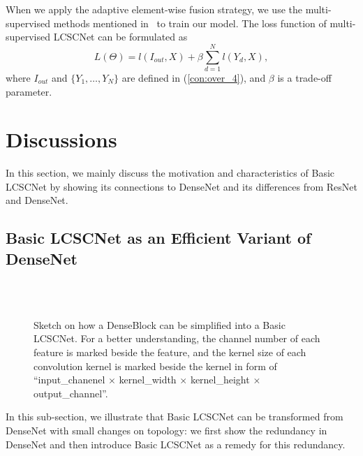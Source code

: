 \documentclass[journal]{IEEEtran}
\begin{document}
When we apply the adaptive element-wise fusion strategy, we use the multi-supervised methods mentioned in~\cite{kim2016deeply,Tai-MemNet-2017} to train our model. The loss function of multi-supervised LCSCNet can be formulated as 
\begin{equation}
L(\Theta)=l(I_{out}, X) + \beta \sum_{d=1}^{N}l(Y_{d}, X),
\label{con:n1}
\end{equation}
where $I_{out}$ and $\{Y_{1},\dots, Y_{N} \}$ are defined in (\ref{con:over_4}), and $\beta$ is a trade-off parameter. 


\section{Discussions}\label{s:s_4}

In this section, we mainly discuss the motivation and characteristics of Basic LCSCNet by showing its connections to DenseNet and its differences from ResNet and DenseNet. 

\subsection{Basic LCSCNet as an Efficient Variant of DenseNet}
\begin{figure*}
    \centering
    \label{fig:D_1}\\
    \label{fig:D_2}\hfill
    \label{fig:D_3}\\
    \label{fig:D_4}\hfill
    \label{fig:D_5}\hfill
    \caption{\small Sketch on how a DenseBlock can be simplified into a Basic LCSCNet. For a better understanding, the channel number of each feature is marked beside the feature, and the kernel size of each convolution kernel is marked beside the kernel in form of ``input\_chanenel $\times$  kernel\_width $\times$ kernel\_height $\times$ output\_channel''.}
    \label{fig:D} 
\end{figure*}

In this sub-section, we illustrate that Basic LCSCNet can be transformed from DenseNet with small changes on topology: we first show the redundancy in DenseNet and then introduce Basic LCSCNet as a remedy for this redundancy.
\end{document}

